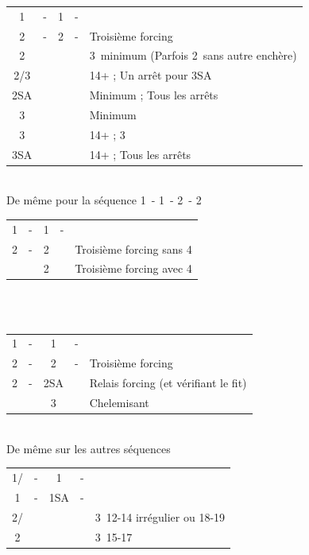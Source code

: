 \documentclass[a4paper, oneside, 11pt]{report}
\begin{document}
		\begin{tabular}{cccc|l}
		1\trefle & - & 1\coeur & - &\\
		2\trefle & - & 2\carreau & - & Troisième forcing\\
		2\coeur &&&& 3\coeur\ minimum (Parfois 2\coeur\ sans autre enchère)\\
		2\pique/3\carreau &&&& 14+ ; Un arrêt pour 3SA\\
		2SA &&&& Minimum ; Tous les arrêts\\
		3\trefle &&&& Minimum\\
		3\coeur &&&& 14+ ; 3\coeur\\
		3SA &&&& 14+ ; Tous les arrêts\\
		\end{tabular}\\
		De même pour la séquence 1\carreau\ - 1\pique\ - 2\carreau\ - 2\coeur\\
			
		\begin{tabular}{cccc|l}
		1\trefle & - & 1\pique & - &\\
		2\trefle & - & 2\carreau && Troisième forcing sans 4\coeur\\
		&& 2\coeur && Troisième forcing avec 4\coeur\\
		\end{tabular}\\\\
			
		\begin{tabular}{cccc|l}
		1\trefle & - & 1\coeur & - &\\
		2\trefle & - & 2\carreau & - & Troisième forcing\\
		2\coeur & - & 2SA && Relais forcing (et vérifiant le fit)\\
		&& 3\coeur &&Chelemisant\\
		\end{tabular}\\
		De même sur les autres séquences\\

		\begin{tabular}{cccc|l}
		1\trefle/\carreau & - & 1\coeur & - &\\
		1\pique  & - & 1SA & - &\\
		2\carreau/\trefle &&&& 3\coeur\ 12-14 irrégulier ou 18-19\\
		2\coeur &&&& 3\coeur\ 15-17\\
		\end{tabular}\\\\
\end{document}
